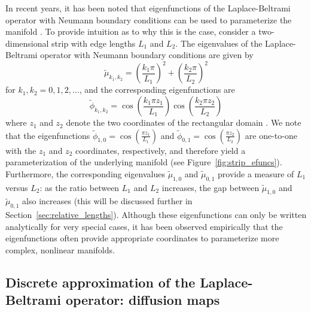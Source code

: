 \documentclass[preprint]{elsarticle}
\begin{document}
In recent years, it has been noted that eigenfunctions of the Laplace-Beltrami operator with Neumann boundary conditions can be used to parameterize the manifold \cite{Belkin2003, coifman2005geometric, singer2008non}. 
%
To provide intuition as to why this is the case, consider a two-dimensional strip with edge lengths $L_1$ and $L_2$. 
%
The eigenvalues of the Laplace-Beltrami operator with Neumann boundary conditions are given by
\begin{equation} \label{eq:evals}
\tilde{\mu}_{k_1, k_2} = \left( \frac{k_1 \pi}{L_1} \right)^2 + \left( \frac{k_2 \pi}{L_2} \right)^2
\end{equation}
for $k_1, k_2 = 0, 1, 2, \dots$,
and the corresponding eigenfunctions are 
\begin{equation} \label{eq:efuncs}
\tilde{\phi}_{k_1, k_2} = \cos \left( \frac{k_1 \pi z_1}{L_1} \right) \cos \left( \frac{k_2 \pi z_2}{L_2} \right)
\end{equation}
where $z_1$ and $z_2$ denote the two coordinates of the rectangular domain \cite{singer2008non}. 
%
We note that the eigenfunctions $\tilde{\phi}_{1, 0} = \cos \left( \frac{\pi z_1}{L_1} \right)$ and $\tilde{\phi}_{0, 1} = \cos \left( \frac{\pi z_2}{L_2} \right)$ are one-to-one with the $z_1$ and $z_2$ coordinates, respectively, and therefore yield a parameterization of the underlying manifold (see Figure~\ref{fig:strip_efuncs}). 
%
Furthermore, the corresponding eigenvalues $\tilde{\mu}_{1,0}$ and $\tilde{\mu}_{0,1}$ provide a measure of $L_1$ versus $L_2$: as the ratio between $L_1$ and $L_2$ increases, the gap between $\tilde{\mu}_{1,0}$ and $\tilde{\mu}_{0,1}$ also increases (this will be discussed further in Section~\ref{sec:relative_lengths}).
%
Although these eigenfunctions can only be written analytically for very special cases, it has been observed empirically that the eigenfunctions often provide appropriate coordinates to parameterize more complex, nonlinear manifolds. 

 


\subsection{Discrete approximation of the Laplace-Beltrami operator: diffusion maps}
\end{document}
